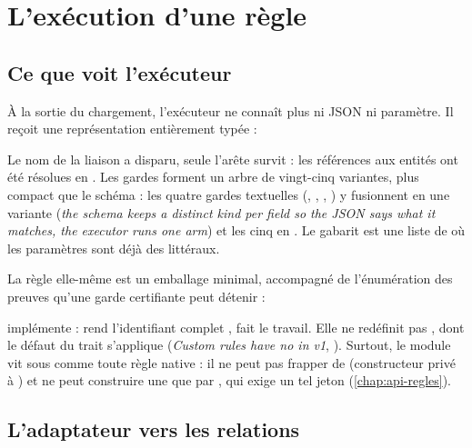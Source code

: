 \section{L'exécution d'une règle}
\label{sec:regles-declaratives-execution}

\subsection{Ce que voit l'exécuteur}

À la sortie du chargement, l'exécuteur ne connaît plus ni JSON ni paramètre. Il reçoit une représentation entièrement typée :


Le nom de la liaison  a disparu, seule l'arête survit : les références aux entités ont été résolues en . Les gardes forment un arbre  de vingt-cinq variantes, plus compact que le schéma : les quatre gardes textuelles (, , , ) y fusionnent en une variante  (\og \emph{the schema keeps a distinct kind per field so the JSON says what it matches, the executor runs one arm}\fg{}) et les cinq  en . Le gabarit est une liste de  où les paramètres sont déjà des littéraux.

La règle elle-même est un emballage minimal, accompagné de l'énumération des preuves qu'une garde certifiante peut détenir :


 implémente  :  rend l'identifiant complet ,  fait le travail. Elle ne redéfinit pas , dont le défaut du trait s'applique (\og \emph{Custom rules have no  in v1}\fg{}, ). Surtout, le module vit sous  comme toute règle native : il ne peut pas frapper de  (constructeur privé à ) et ne peut construire une \Error{} que par , qui exige un tel jeton (\cref{chap:api-regles}).

\subsection{L'adaptateur vers les relations}

